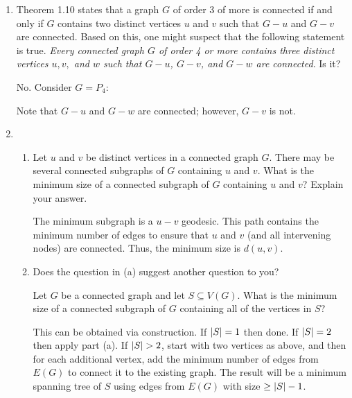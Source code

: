 \documentclass[letterpaper,12pt,fleqn]{article}
\begin{document}
\begin{enumerate}[start=11]
  \bigskip

\item Theorem 1.10 states that a graph \(G\) of order 3 of more is connected if and only if \(G\) contains two
  distinct vertices \(u\) and \(v\) such that \(G-u\) and \(G-v\) are connected.  Based on this, one might suspect
  that the following statement is true.  \emph{Every connected graph \(G\) of order 4 or more contains three
    distinct vertices \(u, v,\) and \(w\) such that \(G-u\), \(G-v\), and \(G-w\) are connected}.  Is it?

  No.  Consider \(G=P_4\):

  \bigskip


  Note that \(G-u\) and \(G-w\) are connected; however, \(G-v\) is not.

  \bigskip

\item
  \begin{enumerate}
  \item Let \(u\) and \(v\) be distinct vertices in a connected graph \(G\).  There may be several connected
    subgraphs of \(G\) containing \(u\) and \(v\).  What is the minimum size of a connected subgraph of \(G\)
    containing \(u\) and \(v\)?  Explain your answer.

    The minimum subgraph is a \(u-v\) geodesic.  This path contains the minimum number of edges to ensure that
    \(u\) and \(v\) (and all intervening nodes) are connected.  Thus, the minimum size is \(d(u,v)\).

  \item Does the question in (a) suggest another question to you?

    Let \(G\) be a connected graph and let \(S\subseteq V(G)\).  What is the minimum size of a connected subgraph
    of \(G\) containing all of the vertices in \(S\)?

    This can be obtained via construction.  If \(\lvert S\rvert=1\) then done.  If \(\lvert S\rvert=2\) then apply part (a).  If
    \(\lvert S\rvert>2\), start with two vertices as above, and then for each additional vertex, add the minimum number of
    edges from \(E(G)\) to connect it to the existing graph.  The result will be a minimum spanning tree of \(S\)
    using edges from \(E(G)\) with size \(\ge\lvert S\rvert-1\).
  \end{enumerate}
\end{enumerate}
\end{document}
